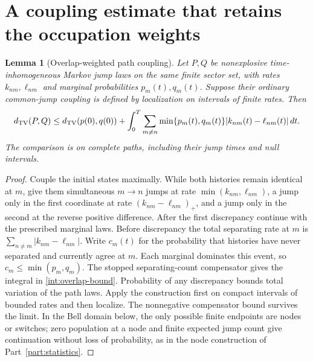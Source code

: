 \documentclass[11pt,oneside,openany]{book}
\newtheorem{lemma}[theorem]{Lemma}
\theoremstyle{definition}
\theoremstyle{remark}\newtheorem{remark}[theorem]{Remark}
\begin{document}
\section{A coupling estimate that retains the occupation weights}
\begin{lemma}[Overlap-weighted path coupling]\label{int:coupling}
Let $P,Q$ be nonexplosive time-inhomogeneous Markov jump laws on the same finite sector set, with rates $k_{nm},\ell_{nm}$ and marginal probabilities $p_m(t),q_m(t)$. Suppose their ordinary common-jump coupling is defined by localization on intervals of finite rates. Then
\begin{equation}\label{int:overlap-bound}
 d_{\rm TV}(P,Q)\le d_{\rm TV}(p(0),q(0))+
 \int_0^T\sum_{m\ne n}\min\{p_m(t),q_m(t)\}|k_{nm}(t)-\ell_{nm}(t)|\,dt.
\end{equation}
The comparison is on complete paths, including their jump times and null intervals.
\end{lemma}
\begin{proof}
Couple the initial states maximally. While both histories remain identical at $m$, give them simultaneous $m\to n$ jumps at rate $\min(k_{nm},\ell_{nm})$, a jump only in the first coordinate at rate $(k_{nm}-\ell_{nm})_+$, and a jump only in the second at the reverse positive difference. After the first discrepancy continue with the prescribed marginal laws. Before discrepancy the total separating rate at $m$ is $\sum_{n\ne m}|k_{nm}-\ell_{nm}|$. Write $c_m(t)$ for the probability that histories have never separated and currently agree at $m$. Each marginal dominates this event, so $c_m\le\min(p_m,q_m)$. The stopped separating-count compensator gives the integral in \eqref{int:overlap-bound}. Probability of any discrepancy bounds total variation of the path laws. Apply the construction first on compact intervals of bounded rates and then localize. The nonnegative compensator bound survives the limit. In the Bell domain below, the only possible finite endpoints are nodes or switches; zero population at a node and finite expected jump count give continuation without loss of probability, as in the node construction of Part~\ref{part:statistics}.
\end{proof}
\end{document}
